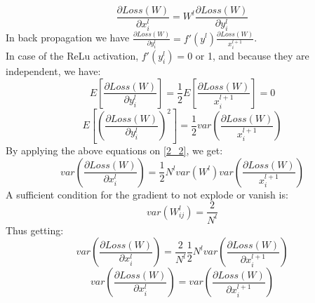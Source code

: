 \begin{equation}\label{2_2}
	\frac{\partial Loss(W)}{\partial x_i^l} = W^l \frac{\partial Loss(W)}{\partial y_i^l}
\end{equation}
In back propagation we have $\frac{\partial Loss(W)}{\partial y_i^l} = f'(y^l)\frac{\partial Loss(W)}{x_i^{l+1}}$.\\
In case of the ReLu activation, $f'(y_i^l) = 0$ or 1, and because they are independent, we have:
\begin{equation*}
	E[\frac{\partial Loss(W)}{\partial y_i^l}] = \frac{1}{2}E[\frac{\partial Loss(W)}{x_i^{l+1}}] = 0
\end{equation*}
\begin{equation*}
	E[(\frac{\partial Loss(W)}{\partial y_i^l})^2] = \frac{1}{2}var(\frac{\partial Loss(W)}{x_i^{l+1}})
\end{equation*}
By applying the above equations on \ref{2_2}, we get:
\begin{equation*}
	var(\frac{\partial Loss(W)}{\partial x_i^l}) = \frac{1}{2}N^lvar(W^l)var(\frac{\partial Loss(W)}{x_i^{l+1}})
\end{equation*}
A sufficient condition for the gradient to not explode or vanish is:
\begin{equation*}
	var(W_{ij}^l) = \frac{2}{N^{l}}
\end{equation*}
Thus getting:
\begin{equation*}
	var(\frac{\partial Loss(W)}{\partial x_i^l}) =  \frac{2}{N^{l}}\frac{1}{2}N^lvar(\frac{\partial Loss(W)}{\partial x_i^{l+1}})
\end{equation*}
 \begin{equation*}
	var(\frac{\partial Loss(W)}{\partial x_i^l}) =var(\frac{\partial Loss(W)}{\partial x_i^{l+1}})
\end{equation*}
